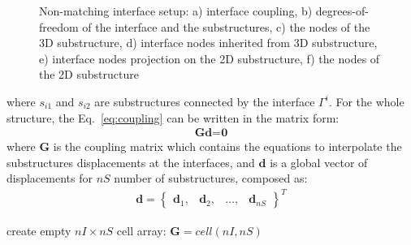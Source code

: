 \documentclass[a4paper,12pt]{article}
\begin{document}
{\begin{figure}
	\caption{Non-matching interface setup: a) interface coupling, b) degrees-of-freedom of the interface and the substructures, c) the nodes of the 3D substructure, d) interface nodes inherited from 3D substructure, e) interface nodes projection on the 2D substructure, f) the nodes of the 2D substructure}
	\label{fig:interface}
\end{figure}
where \(s_{i1}\) and \(s_{i2}\) are substructures connected by the interface \(\Gamma^i\). For the whole structure, the Eq.~\ref{eq:coupling} can be written in the matrix form:
\begin{eqnarray}
\textbf{G}\textbf{d}=\textbf{0}
\label{eq:cond_disp}
\end{eqnarray}
where \textbf{G} is the coupling matrix which contains the equations to interpolate the substructures displacements at the interfaces, and \(\textbf{d}\) is a global vector of displacements for \(nS\) number of substructures, composed as:
\begin{eqnarray}
\textbf{d} = \left\{\begin{array}{cccc}
\textbf{d}_1, & \textbf{d}_2, &\ldots, & \textbf{d}_{nS}
\end{array}\right\}^T
\label{eq:displacements}
\end{eqnarray}

\begin{algorithm}
	\SetAlgoLined
	create empty \(nI \times nS\) cell array: \(\mathbf{G} = cell(nI,nS)\)\;
\end{algorithm}}
\end{document}
